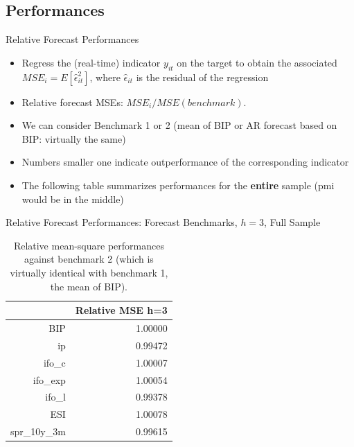 \documentclass{beamer}
\begin{document}
\subsection{Performances}



\begin{frame} {Relative Forecast Performances}
\begin{itemize}

\item Regress the (real-time) indicator $y_{it}$ on the target to obtain the associated $MSE_i=E[\hat{\epsilon}_{it}^2]$, where $\hat{\epsilon}_{it}$ is the residual of the regression

\item Relative forecast MSEs: $MSE_i/MSE(benchmark)$. 
\item We can consider Benchmark 1 or 2 (mean of BIP or AR forecast based on BIP: virtually the same)
\item Numbers smaller one indicate outperformance of the corresponding indicator
\item The following table summarizes performances for the \textbf{entire} sample (pmi would be in the middle)
\end{itemize}

\end{frame}




\begin{frame} {Relative Forecast Performances: Forecast Benchmarks, $h=3$, Full Sample}\label{rmse1}

\begin{table}[ht]
\centering
\begin{tabular}{rr}
  \hline
 & Relative MSE h=3 \\ 
  \hline
BIP & 1.00000 \\ 
  ip & 0.99472 \\ 
  ifo\_c & 1.00007 \\ 
  ifo\_exp & 1.00054 \\ 
  ifo\_l & 0.99378 \\ 
  ESI & 1.00078 \\ 
  spr\_10y\_3m & 0.99615 \\ 
   \hline
\end{tabular}
\caption{Relative mean-square performances against benchmark 2 (which is virtually identical with benchmark 1, the mean of BIP).} 
\label{perf_var1}
\end{table}\end{frame}
\end{document}
